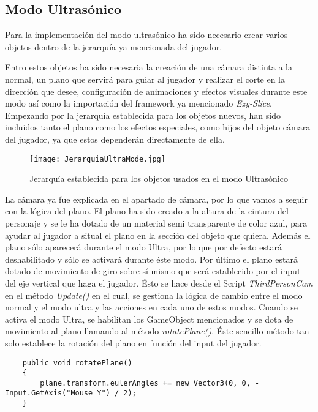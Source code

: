 \subsection{Modo Ultrasónico}

Para la implementación del modo ultrasónico ha sido necesario crear varios objetos dentro de la jerarquía ya mencionada del jugador. 

Entro estos objetos ha sido necesaria la creación de una cámara distinta a la normal, un plano que servirá para guiar al jugador y realizar el corte en la dirección que desee, configuración de animaciones y efectos visuales durante este modo así como la importación del framework ya mencionado \textit{Ezy-Slice}. Empezando por la jerarquía establecida para los objetos nuevos, han sido incluidos tanto el plano como los efectos especiales, como hijos del objeto cámara del jugador, ya que estos dependerán directamente de ella.

\begin{figure}[H]
    \centering
    \texttt{[image: JerarquiaUltraMode.jpg]}
    \caption{Jerarquía establecida para los objetos usados en el modo Ultrasónico}
\end{figure}

La cámara ya fue explicada en el apartado de cámara, por lo que vamos a seguir con la lógica del plano. El plano ha sido creado a la altura de la cintura del personaje y se le ha dotado de un material semi transparente de color azul, para ayudar al jugador a situal el plano en la sección del objeto que quiera. Además el plano sólo aparecerá durante el modo Ultra, por lo que por defecto estará deshabilitado y sólo se activará durante éste modo. Por último el plano estará dotado de movimiento de giro sobre sí mismo que será establecido por el input del eje vertical que haga el jugador. Ésto se hace desde el Script \textit{ThirdPersonCam} en el método \textit{Update()} en el cual, se gestiona la lógica de cambio entre el modo normal y el modo ultra y las acciones en cada uno de estos modos. Cuando se activa el modo Ultra, se habilitan los GameObject mencionados y se dota de movimiento al plano llamando al método \textit{rotatePlane()}. Éste sencillo método tan solo establece la rotación del plano en función del input del jugador.

\begin{lstlisting}
    public void rotatePlane()
    {
        plane.transform.eulerAngles += new Vector3(0, 0, -Input.GetAxis("Mouse Y") / 2);
    }
\end{lstlisting}

